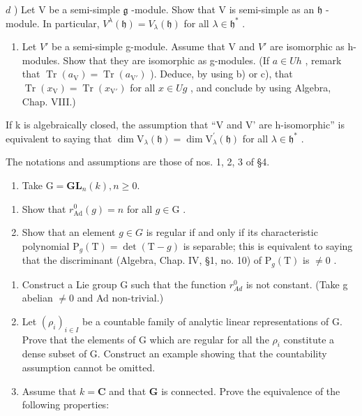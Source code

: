\(d\) ) Let V be a semi-simple \(\mathfrak{g}\) -module. Show that V is semi-simple as an \(\mathfrak{h}\) -module. In particular, \(V^{\lambda}(\mathfrak{h}) = V_{\lambda}(\mathfrak{h})\) for all \(\lambda \in \mathfrak{h}^{*}\) .

\begin{enumerate}
\def\labelenumi{\alph{enumi})}
\setcounter{enumi}{4}
\tightlist
\item
  Let \(V'\) be a semi-simple g-module. Assume that V and \(V'\) are isomorphic as h-modules. Show that they are isomorphic as g-modules. (If \(a \in Uh\) , remark that \(\operatorname{Tr}(a_{\mathrm{V}}) = \operatorname{Tr}(a_{\mathrm{V}'})\) ). Deduce, by using b) or c), that \(\operatorname{Tr}(x_{\mathrm{V}}) = \operatorname{Tr}(x_{\mathrm{V}'})\) for all \(x \in Ug\) , and conclude by using Algebra, Chap. VIII.)
\end{enumerate}

If k is algebraically closed, the assumption that ``V and V' are h-isomorphic'' is equivalent to saying that \(\dim\mathrm{V}_{\lambda}(\mathfrak{h})=\dim\mathrm{V}_{\lambda}^{\prime}(\mathfrak{h})\) for all \(\lambda\in\mathfrak{h}^{*}\) .


The notations and assumptions are those of nos. 1, 2, 3 of §4.

\begin{enumerate}
\def\labelenumi{\arabic{enumi})}
\tightlist
\item
  Take \(\mathrm{G} = \mathbf{GL}_{n}(k), n \geq 0.\)
\end{enumerate}

\begin{enumerate}
\def\labelenumi{\alph{enumi})}
\item
  Show that \(r_{\mathrm{Ad}}^0 (g) = n\) for all \(g \in \mathrm{G}\) .
\item
  Show that an element \(g \in G\) is regular if and only if its characteristic polynomial \(\mathrm{P}_{g}(\mathrm{T}) = \det(\mathrm{T} - g)\) is separable; this is equivalent to saying that the discriminant (Algebra, Chap. IV, §1, no. 10) of \(\mathrm{P}_{g}(\mathrm{T})\) is \(\neq 0\) .
\end{enumerate}

\begin{enumerate}
\def\labelenumi{\arabic{enumi})}
\setcounter{enumi}{1}
\item
  Construct a Lie group G such that the function \(r_{Ad}^{0}\) is not constant. (Take g abelian \(\neq 0\) and Ad non-trivial.)
\item
  Let \((\rho_{i})_{i\in I}\) be a countable family of analytic linear representations of G. Prove that the elements of G which are regular for all the \(\rho_{i}\) constitute a dense subset of G. Construct an example showing that the countability assumption cannot be omitted.
\item
  Assume that \(k = \mathbf{C}\) and that \(\mathbf{G}\) is connected. Prove the equivalence of the following properties:
\end{enumerate}


